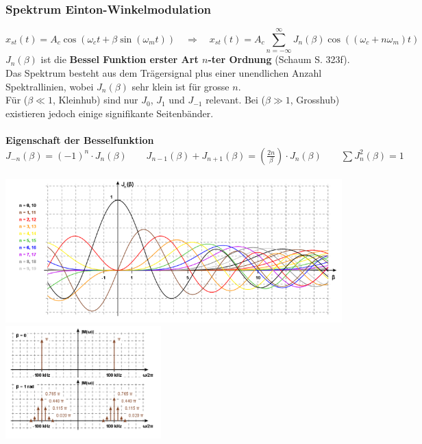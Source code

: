 \subsubsection{Spektrum Einton-Winkelmodulation}
	\begin{equation*}
		x_{st}(t) = A_c \cos(\omega_c t + \beta \sin(\omega_m t)) \quad \Rightarrow \quad 
			\boxed{	x_{st}(t) = A_c \sum\limits_{n=-\infty}^{\infty} J_n(\beta) \cos((\omega_c + n \omega_m)t)}
	\end{equation*}
	\textbf{$J_n(\beta)$} ist die \textbf{Bessel Funktion erster Art $n$-ter Ordnung} (Schaum
	S. 323f). Das Spektrum besteht aus dem Trägersignal plus einer unendlichen Anzahl Spektrallinien,
	wobei $J_n(\beta)$ sehr klein ist für grosse $n$. \\
	Für ($\beta \ll 1$, Kleinhub) sind nur $J_0$, $J_1$ und $ J_{-1}$ relevant. Bei ($\beta \gg 1$,
	Grosshub) existieren jedoch einige signifikante Seitenbänder.\\ \\
	\textbf{Eigenschaft der Besselfunktion}\\
	$J_{-n}(\beta) = (-1)^n \cdot J_n(\beta) \qquad
	J_{n-1}(\beta) + J_{n+1}(\beta) = (\frac{2n}{\beta})\cdot J_n(\beta) \qquad \sum J_n^2(\beta) = 1$\\ \\
	\includegraphics[width=13cm]{bilder/Besselfunktionen.png}
	\includegraphics[width=6cm]{bilder/Besselfunktionen_Spektrum.png}
	
